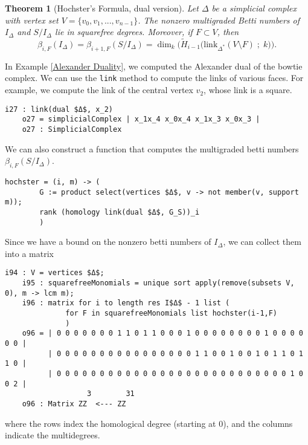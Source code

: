 \documentclass[12pt,leqno]{amsart}
\newtheorem{theorem}[lemma]{Theorem}
\theoremstyle{definition}
\newenvironment{example}
{\pushQED{\qed}\renewcommand{\qedsymbol}{$\diamond$}\examplex}
{\popQED\endexamplex}
\begin{document}
%
\begin{theorem}[Hochster's Formula, dual version]
  Let $\Delta$ be a simplicial complex with vertex set $V = \{ v_0,v_1,...,v_{n-1} \}$. The nonzero multigraded Betti numbers of $I_\Delta$ and $S/I_\Delta$ lie in squarefree degrees. Moreover, if $F \subset V$, then
  \begin{displaymath}
    \beta_{i,F} (I_\Delta) = \beta_{i+1,F} (S/I_\Delta) = \dim_k\Big(\widetilde H_{i-1} \big( \mathrm{link}_{\Delta^*}(V \setminus F)\; ; \; k \big) \Big).
  \end{displaymath}
\end{theorem}
%
\begin{example}
  In Example \ref{Alexander Duality}, we computed the Alexander dual of the bowtie complex. We can use the \texttt{link} method to compute the links of various faces. For example, we compute the link of the central vertex $v_2$, whose link is a square.
\begin{lstlisting}[basicstyle={\ttfamily \scriptsize}, xleftmargin=-23pt]
    i27 : link(dual $Δ$, x_2)
    o27 = simplicialComplex | x_1x_4 x_0x_4 x_1x_3 x_0x_3 |
    o27 : SimplicialComplex
\end{lstlisting}
  We can also construct a function that computes the multigraded betti numbers $\beta_{i,F}(S/I_\Delta)$.
\begin{lstlisting}[basicstyle={\ttfamily \scriptsize}, xleftmargin=-23pt]
    hochster = (i, m) -> (
        G := product select(vertices $Δ$, v -> not member(v, support m));
        rank (homology link(dual $Δ$, G_S))_i
        )
\end{lstlisting}
  Since we have a bound on the nonzero betti numbers of $I_\Delta$, we can collect them into a matrix
\begin{lstlisting}[basicstyle={\ttfamily \scriptsize}, xleftmargin=-23pt]
    i94 : V = vertices $Δ$;
    i95 : squarefreeMonomials = unique sort apply(remove(subsets V, 0), m -> lcm m);
    i96 : matrix for i to length res I$Δ$ - 1 list (
              for F in squarefreeMonomials list hochster(i-1,F)
              )
    o96 = | 0 0 0 0 0 0 0 1 1 0 1 1 0 0 0 1 0 0 0 0 0 0 0 0 1 0 0 0 0 0 0 |
          | 0 0 0 0 0 0 0 0 0 0 0 0 0 0 0 0 1 1 0 0 1 0 0 1 0 1 1 0 1 1 0 |
          | 0 0 0 0 0 0 0 0 0 0 0 0 0 0 0 0 0 0 0 0 0 0 0 0 0 0 0 1 0 0 2 |
                   3        31
    o96 : Matrix ZZ  <--- ZZ
\end{lstlisting}
  where the rows index the homological degree (starting at $0$), and the columns indicate the multidegrees.
\end{example}
%
\end{document}

